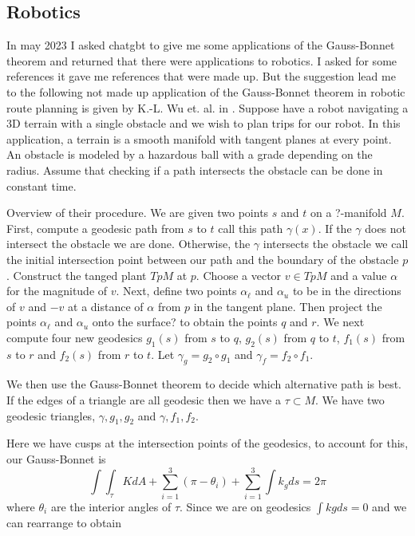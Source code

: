 \subsection{Robotics}
\label{sec:robotics}
In may 2023 I asked chatgbt to give me some applications of the Gauss-Bonnet theorem and returned
that there were applications to robotics. I asked for some references it gave me references
that were made up. But the suggestion lead me to the following
not made up application of the Gauss-Bonnet theorem in robotic 
route planning is given by K.-L. Wu et. al. in \cite{wu_path_2016}.
Suppose have a robot navigating a 3D terrain with a single obstacle
and we wish to plan trips for our robot.
In this application, a terrain is a smooth manifold  with tangent planes
at every point. An obstacle is modeled by a hazardous ball with a grade depending on the radius.
Assume that checking if a path intersects the obstacle can be done in constant time.


Overview of their procedure.
We are given two points $s$ and $t$ on a ?-manifold $M$.
First, compute a geodesic path from  $s$ to $t$ call this path $\gamma(x)$.
If the $\gamma$ does not intersect the obstacle we are done.
Otherwise, the $\gamma$ intersects the obstacle
we call the initial intersection point between our path
and the boundary of the obstacle $p$.
Construct the tanged plant $TpM$ at $p$.
Choose a vector $v\in TpM$ and a value $\alpha$ for the magnitude of $v$.
Next, define two points $\alpha_{\ell}$ and $\alpha_{u}$
to be in the directions of $v$ and $-v$ at a distance of $\alpha$
from $p$ in the tangent plane. Then project the points   $\alpha_{\ell}$ and $\alpha_{u}$
onto the surface? to obtain the points $q$ and $r$.
We next compute four new  geodesics $g_1(s)$ from $s$ to $q$,
$g_2(s)$ from $q$ to $t$, 
$f_1(s)$ from $s$ to $r$ and 
$f_2(s)$ from $r$ to $t$. Let $\gamma_g=g_2\circ g_1$ and $\gamma_f=f_2\circ f_1$.

We then use the Gauss-Bonnet theorem to decide which alternative path is best.
If the edges of a triangle are all geodesic then we have a  $\tau\subset M$.
We have two geodesic triangles, $\gamma, g_1,g_2$ and $\gamma,f_1,f_2.$

Here we have cusps at the intersection points of the geodesics,
to account for this, our Gauss-Bonnet is 
\begin{equation}\label{eqn:b-g-angles}
\int \int_{\tau} K dA +\sum_{i=1}^3(\pi-\theta_i)+\sum_{i=1}^3 \int k_gds =2\pi
\end{equation}
where $\theta_i$ are the interior angles of $\tau$.
Since we are on geodesics $\int kgds =0$ and we can rearrange
 to obtain


